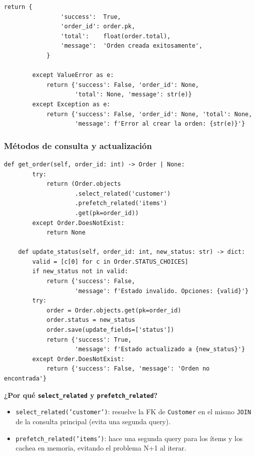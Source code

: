 \documentclass[12pt, a4paper]{article}
\begin{document}
\begin{lstlisting}[caption={orders/services.py — create\_order}]
            return {
                'success':  True,
                'order_id': order.pk,
                'total':    float(order.total),
                'message':  'Orden creada exitosamente',
            }

        except ValueError as e:
            return {'success': False, 'order_id': None,
                    'total': None, 'message': str(e)}
        except Exception as e:
            return {'success': False, 'order_id': None, 'total': None,
                    'message': f'Error al crear la orden: {str(e)}'}
\end{lstlisting}

\subsubsection{Métodos de consulta y actualización}

\begin{lstlisting}[caption={orders/services.py — consultas}]
    def get_order(self, order_id: int) -> Order | None:
        try:
            return (Order.objects
                    .select_related('customer')
                    .prefetch_related('items')
                    .get(pk=order_id))
        except Order.DoesNotExist:
            return None

    def update_status(self, order_id: int, new_status: str) -> dict:
        valid = [c[0] for c in Order.STATUS_CHOICES]
        if new_status not in valid:
            return {'success': False,
                    'message': f'Estado invalido. Opciones: {valid}'}
        try:
            order = Order.objects.get(pk=order_id)
            order.status = new_status
            order.save(update_fields=['status'])
            return {'success': True,
                    'message': f'Estado actualizado a {new_status}'}
        except Order.DoesNotExist:
            return {'success': False, 'message': 'Orden no encontrada'}
\end{lstlisting}

\textbf{¿Por qué \texttt{select\_related} y \texttt{prefetch\_related}?}

\begin{itemize}
    \item \texttt{select\_related('customer')}: resuelve la FK de \texttt{Customer} en el mismo \texttt{JOIN} de la consulta principal (evita una segunda query).
    \item \texttt{prefetch\_related('items')}: hace una segunda query para los ítems y los cachea en memoria, evitando el problema N+1 al iterar.
\end{itemize}
\end{document}
